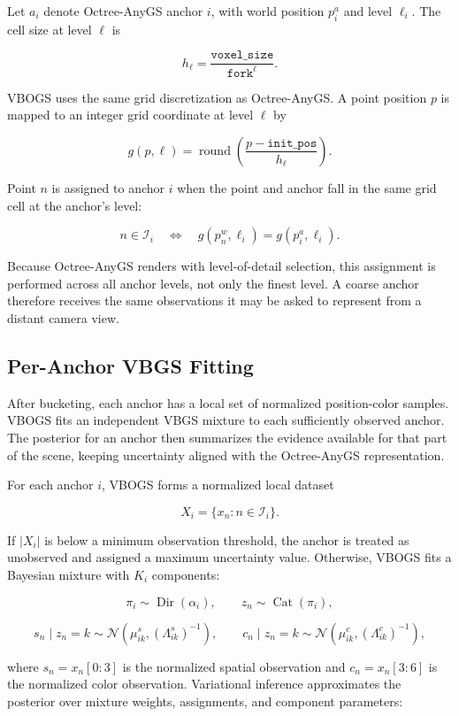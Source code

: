 \documentclass{article}
\begin{document}
Let \(a_i\) denote Octree-AnyGS anchor \(i\), with world position \(p_i^a\) and level \(\ell_i\). The cell size at level \(\ell\) is

\[
  h_\ell =
  \frac{\texttt{voxel\_size}}{\texttt{fork}^{\ell}}.
\]

VBOGS uses the same grid discretization as Octree-AnyGS. A point position \(p\) is mapped to an integer grid coordinate at level \(\ell\) by

\[
  g(p,\ell) =
  \operatorname{round}
  \left(
    \frac{p - \texttt{init\_pos}}{h_\ell}
  \right).
\]

Point \(n\) is assigned to anchor \(i\) when the point and anchor fall in the same grid cell at the anchor's level:

\[
  n \in \mathcal{I}_i
  \quad \Longleftrightarrow \quad
  g(p_n^w,\ell_i) = g(p_i^a,\ell_i).
\]

Because Octree-AnyGS renders with level-of-detail selection, this assignment is performed across all anchor levels, not only the finest level. A coarse anchor therefore receives the same observations it may be asked to represent from a distant camera view.

\subsection{Per-Anchor VBGS Fitting}
After bucketing, each anchor has a local set of normalized position-color samples. VBOGS fits an independent VBGS mixture to each sufficiently observed anchor. The posterior for an anchor then summarizes the evidence available for that part of the scene, keeping uncertainty aligned with the Octree-AnyGS representation.

For each anchor \(i\), VBOGS forms a normalized local dataset

\[
  X_i = \{x_n : n \in \mathcal{I}_i\}.
\]

If \(|X_i|\) is below a minimum observation threshold, the anchor is treated as unobserved and assigned a maximum uncertainty value. Otherwise, VBOGS fits a Bayesian mixture with \(K_i\) components:

\[
  \pi_i \sim \operatorname{Dir}(\alpha_i),
  \qquad
  z_n \sim \operatorname{Cat}(\pi_i),
\]

\[
  s_n \mid z_n = k \sim
  \mathcal{N}\left(\mu^s_{ik},(\Lambda^s_{ik})^{-1}\right),
  \qquad
  c_n \mid z_n = k \sim
  \mathcal{N}\left(\mu^c_{ik},(\Lambda^c_{ik})^{-1}\right),
\]

where \(s_n = x_n[0:3]\) is the normalized spatial observation and \(c_n = x_n[3:6]\) is the normalized color observation. Variational inference approximates the posterior over mixture weights, assignments, and component parameters:
\end{document}
